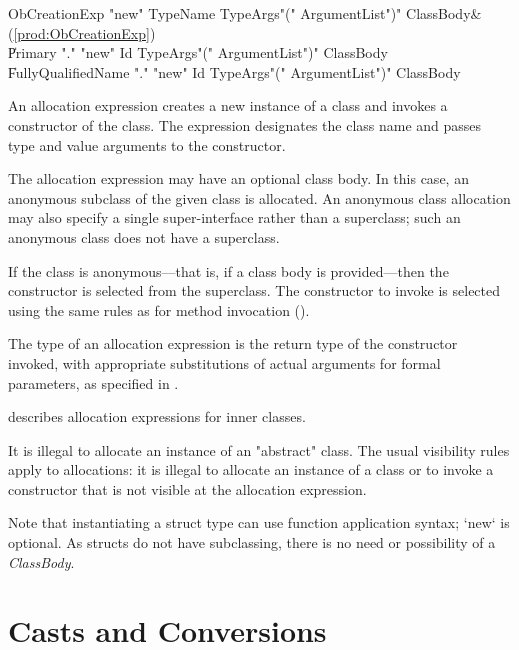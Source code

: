 \begin{bbgrammar}
       ObCreationExp \: \xcd"new" TypeName TypeArgs\opt \xcd"(" ArgumentList\opt \xcd")" ClassBody\opt & (\ref{prod:ObCreationExp}) \\
                     \| Primary \xcd"." \xcd"new" Id TypeArgs\opt \xcd"(" ArgumentList\opt \xcd")" ClassBody\opt \\
                     \| FullyQualifiedName \xcd"." \xcd"new" Id TypeArgs\opt \xcd"(" ArgumentList\opt \xcd")" ClassBody\opt \\
\end{bbgrammar}

An allocation expression creates a new instance of a class and
invokes a constructor of the class.
The expression designates the class name and passes
type and value arguments to the constructor.

The allocation expression may have an optional class body.
In this case, an anonymous subclass of the given class is
allocated.   An anonymous class allocation may also specify a
single super-interface rather than a superclass; such an anonymous
class does not have a superclass.

If the class is anonymous---that is, if a class body is
provided---then the constructor is selected from the superclass.
The constructor to invoke is selected using the same rules as
for method invocation ().

The type of an allocation expression
is the return type of the constructor invoked, with appropriate
substitutions  of actual arguments for formal parameters, as
specified in .

 describes allocation expressions for inner classes. 

It is illegal to allocate an instance of an \xcd"abstract" class.
The usual visibility rules apply to allocations: 
it is illegal to allocate an instance of a class or to invoke a
constructor that is not visible at
the allocation expression.

Note that instantiating a struct type can use function application syntax; 
\xcd`new` is optional.  As structs do not have subclassing, there is no need or
possibility of a {\em ClassBody}.


\section{Casts and Conversions}\label{ClassCast}


